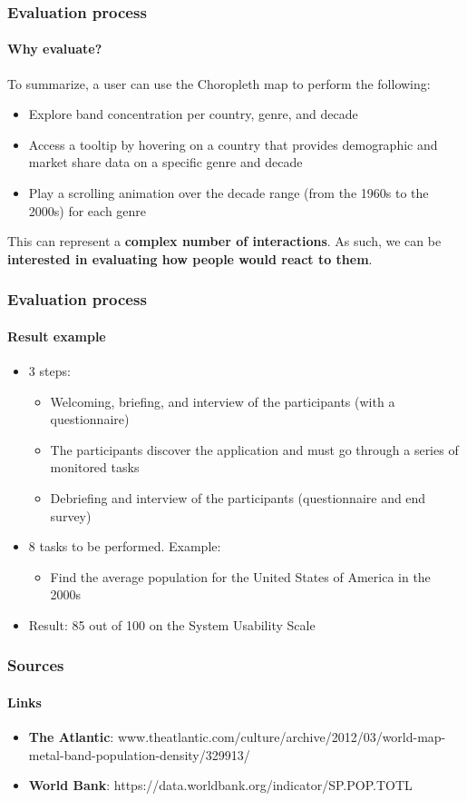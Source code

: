 \documentclass[aspectratio=43,10pt]{beamer}
\begin{document}
\begin{frame}
    \frametitle{Evaluation process}
    \framesubtitle{Why evaluate?}
    To summarize, a user can use the Choropleth map to perform the following:
    \begin{itemize}
        \item Explore band concentration per country, genre, and decade
        \item Access a tooltip by hovering on a country that provides demographic and market share data on a specific genre and decade
        \item Play a scrolling animation over the decade range (from the 1960s to the 2000s) for each genre
    \end{itemize}
    This can represent a \textbf{complex number of interactions}. As such, we can be \textbf{interested in evaluating how people would react to them}.
\end{frame}

\begin{frame}
    \frametitle{Evaluation process}
    \framesubtitle{Result example}
    \begin{itemize}
        \item 3 steps:
        \begin{itemize}
        \item Welcoming, briefing, and interview of the participants (with a questionnaire)
        \item The participants discover the application and must go through a series of monitored tasks
        \item Debriefing and interview of the participants (questionnaire and end survey)
        \end{itemize}
        \item 8 tasks to be performed. Example:
        \begin{itemize}
            \item Find the average population for the United States of America in the 2000s
        \end{itemize}
        \item Result: 85 out of 100 on the System Usability Scale
    \end{itemize}
\end{frame}

\begin{frame}
    \frametitle{Sources}
    \framesubtitle{Links}
    \begin{itemize}
        \item \textbf{The Atlantic}: www.theatlantic.com/culture/archive/2012/03/world-map-metal-band-population-density/329913/
        \item \textbf{World Bank}: https://data.worldbank.org/indicator/SP.POP.TOTL
    \end{itemize}
\end{frame}

\end{document}
